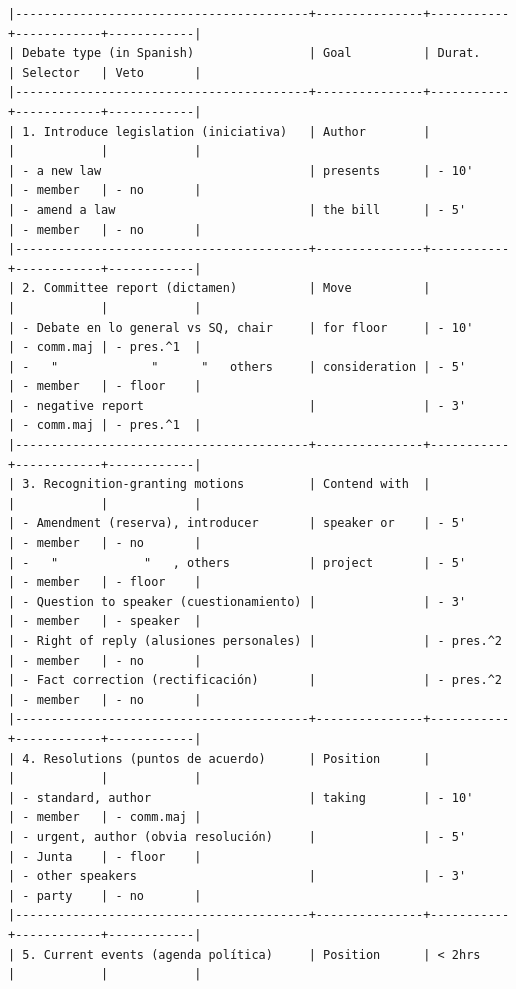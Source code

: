 \documentclass[letter,12pt]{article}
\begin{document}
\begin{table}
  \begin{scriptsize}
    \begin{verbatim}
|-----------------------------------------+---------------+-----------+------------+------------|
| Debate type (in Spanish)                | Goal          | Durat.    | Selector   | Veto       |
|-----------------------------------------+---------------+-----------+------------+------------|
| 1. Introduce legislation (iniciativa)   | Author        |           |            |            |
| - a new law                             | presents      | - 10'     | - member   | - no       |
| - amend a law                           | the bill      | - 5'      | - member   | - no       |
|-----------------------------------------+---------------+-----------+------------+------------|
| 2. Committee report (dictamen)          | Move          |           |            |            |
| - Debate en lo general vs SQ, chair     | for floor     | - 10'     | - comm.maj | - pres.^1  |
| -   "             "      "   others     | consideration | - 5'      | - member   | - floor    |
| - negative report                       |               | - 3'      | - comm.maj | - pres.^1  |
|-----------------------------------------+---------------+-----------+------------+------------|
| 3. Recognition-granting motions         | Contend with  |           |            |            |
| - Amendment (reserva), introducer       | speaker or    | - 5'      | - member   | - no       |
| -   "            "   , others           | project       | - 5'      | - member   | - floor    |
| - Question to speaker (cuestionamiento) |               | - 3'      | - member   | - speaker  |
| - Right of reply (alusiones personales) |               | - pres.^2 | - member   | - no       |
| - Fact correction (rectificación)       |               | - pres.^2 | - member   | - no       |
|-----------------------------------------+---------------+-----------+------------+------------|
| 4. Resolutions (puntos de acuerdo)      | Position      |           |            |            |
| - standard, author                      | taking        | - 10'     | - member   | - comm.maj |
| - urgent, author (obvia resolución)     |               | - 5'      | - Junta    | - floor    |
| - other speakers                        |               | - 3'      | - party    | - no       |
|-----------------------------------------+---------------+-----------+------------+------------|
| 5. Current events (agenda política)     | Position      | < 2hrs    |            |            |

\end{verbatim}
\end{scriptsize}
\end{table}
\end{document}
